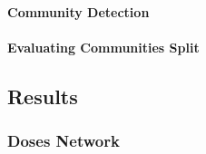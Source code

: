 \paragraph{Community Detection}
\label{clustering_evaluation}

\paragraph{Evaluating Communities Split}
%
%


\subsection{Results}
\subsubsection{Doses Network}
